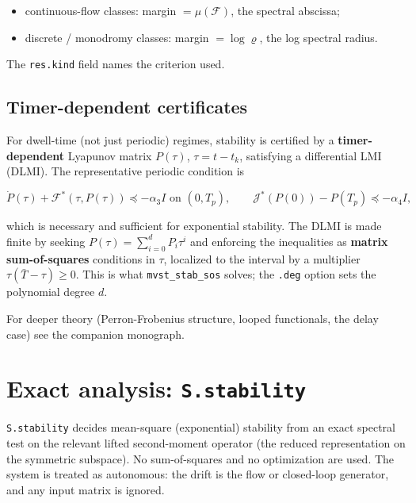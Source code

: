 \documentclass[11pt,oneside]{report}
\newcommand{\code}[1]{\texttt{#1}}
\providecommand{\tightlist}{\setlength{\itemsep}{0pt}\setlength{\parskip}{0pt}}
\begin{document}
\begin{itemize}
\tightlist
\item
  continuous-flow classes: margin \(=\mu(\mathcal{F})\), the spectral abscissa;
\item
  discrete / monodromy classes: margin \(=\log\varrho\), the log spectral radius.
\end{itemize}

The \code{res.kind} field names the criterion used.

\hypertarget{timer-dependent-certificates}{%
\subsection{Timer-dependent certificates}\label{timer-dependent-certificates}}

For dwell-time (not just periodic) regimes, stability is certified by a
\textbf{timer-dependent} Lyapunov matrix \(P(\tau)\), \(\tau=t-t_k\), satisfying a
differential LMI (DLMI). The representative periodic condition is

\[\dot P(\tau)+\mathcal{F}^{*}(\tau,P(\tau))\preceq-\alpha_3 I \text{ on } (0,T_p),\qquad \mathcal{J}^{*}(P(0))-P(T_p)\preceq-\alpha_4 I,\]

which is necessary and sufficient for exponential stability. The DLMI is made
finite by seeking \(P(\tau)=\sum_{i=0}^{d}P_i\tau^{i}\) and enforcing the
inequalities as \textbf{matrix sum-of-squares} conditions in \(\tau\), localized to the
interval by a multiplier \(\tau(\bar T-\tau)\ge0\). This is what \code{mvst\_stab\_sos}
solves; the \code{.deg} option sets the polynomial degree \(d\).

For deeper theory (Perron-Frobenius structure, looped functionals, the
delay case) see the companion monograph.

\hypertarget{exact-analysis-s.stability}{%
\section{\texorpdfstring{Exact analysis: \code{S.stability}}{Exact analysis: S.stability}}\label{exact-analysis-s.stability}}

\code{S.stability} decides mean-square (exponential) stability from an exact
spectral test on the relevant lifted second-moment operator (the reduced
representation on the symmetric subspace). No sum-of-squares and no
optimization are used. The system is treated as autonomous: the drift is the
flow or closed-loop generator, and any input matrix is ignored.
\end{document}
